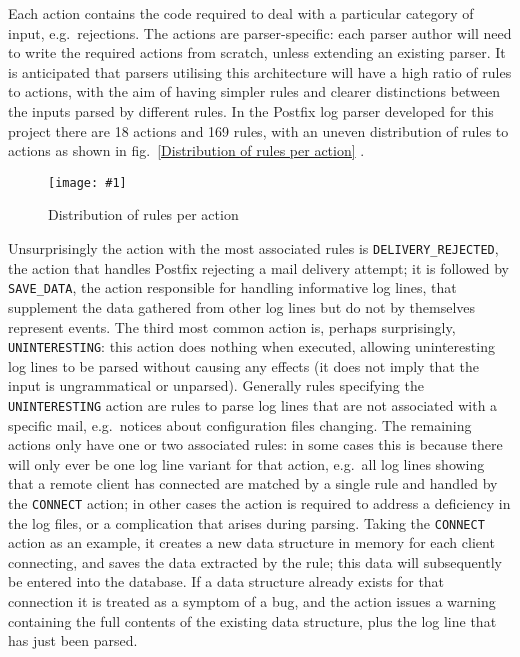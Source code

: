 \documentclass{svmult}
\newcommand{\showgraph}[3]{%
    \begin{figure}[btp]%
        \texttt{[image: \#1]}%
        \caption{#2}\label{#3}%
    \end{figure}%
}
\newcommand{\refwithlabel}[2]{%
    #1~\vref{#2}%
}
\newcommand{\graphref}[1]{%
    \refwithlabel{fig.}{#1}%
}
\newcommand{\numberOFrules}[0]{%
    169%
}
\newcommand{\numberOFactions}[0]{%
    18%
}
\begin{document}
Each action contains the code required to deal with a particular category
of input, e.g.\ rejections.  The actions are parser-specific: each parser
author will need to write the required actions from scratch, unless
extending an existing parser.  It is anticipated that parsers utilising
this architecture will have a high ratio of rules to actions, with the aim
of having simpler rules and clearer distinctions between the inputs parsed
by different rules.  In the Postfix log parser developed for this project
there are \numberOFactions{} actions and \numberOFrules{} rules, with an
uneven distribution of rules to actions as shown in \graphref{Distribution
of rules per action}.
\showgraph{build/graph-action-distribution}{Distribution of rules per
action}{Distribution of rules per action} Unsurprisingly the action with
the most associated rules is \texttt{DELIVERY\_REJECTED}, the action that
handles Postfix rejecting a mail delivery attempt; it is followed by
\texttt{SAVE\_DATA}, the action responsible for handling informative log
lines, that supplement the data gathered from other log lines but do not by
themselves represent events.  The third most common action is, perhaps
surprisingly, \texttt{UNINTERESTING}: this action does nothing when
executed, allowing uninteresting log lines to be parsed without causing any
effects (it does not imply that the input is ungrammatical or unparsed).
Generally rules specifying the \texttt{UNINTERESTING} action are rules to
parse log lines that are not associated with a specific mail, e.g.\
notices about configuration files changing.  The remaining actions only
have one or two associated rules: in some cases this is because there will
only ever be one log line variant for that action, e.g.\ all log lines
showing that a remote client has connected are matched by a single rule and
handled by the \texttt{CONNECT} action; in other cases the action is
required to address a deficiency in the log files, or a complication that
arises during parsing.  Taking the \texttt{CONNECT} action as an example,
it creates a new data structure in memory for each client connecting, and
saves the data extracted by the rule; this data will subsequently be
entered into the database.  If a data structure already exists for that
connection it is treated as a symptom of a bug, and the action issues a
warning containing the full contents of the existing data structure, plus
the log line that has just been parsed.
\end{document}
